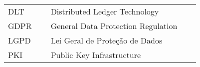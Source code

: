 

\begin{listaacron}

\begin{longtable}[l]{p{0.2\linewidth}p{0.7\linewidth}}
DLT & Distributed Ledger Technology\\
GDPR & General Data Protection Regulation\\
LGPD & Lei Geral de Proteção de Dados\\
PKI & Public Key Infrastructure\\
\end{longtable}

\end{listaacron}

